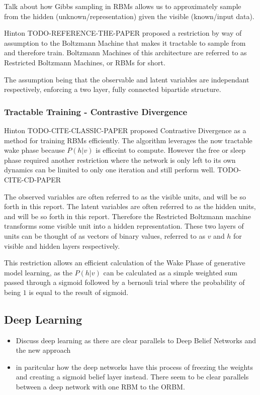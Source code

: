   \todo%
  Talk about how Gibbs sampling in RBMs allows us to approximately sample from the hidden (unknown/representation) given the visible (known/input data).
  \todo%

  Hinton TODO-REFERENCE-THE-PAPER proposed a restriction by way of assumption to the Boltzmann Machine that makes it tractable to sample from and therefore train. Boltzmann Machines of this architecture are referred to as Restricted Boltzmann Machines, or RBMs for short.

  The assumption being that the observable and latent variables are independant respectively, enforcing a two layer, fully connected bipartide structure.

    \subsubsection{Tractable Training - Contrastive Divergence}
    Hinton TODO-CITE-CLASSIC-PAPER proposed Contrastive Divergence as a method for training RBMs efficiently. The algorithm leverages the now tractable wake phase because $P(h|v)$ is efficeint to compute. However the free or sleep phase required another restriction where the network is only left to its own dynamics can be limited to only one iteration and still perform well. TODO-CITE-CD-PAPER

  The observed variables are often referred to as the visible units, and will be so forth in this report. The latent variables are often referred to as the hidden units, and will be so forth in this report. Therefore the Restricted Boltzmann machine transforms some visible unit into a hidden representation. These two layers of units can be thought of as vectors of binary values, referred to as $ v $ and $ h $ for visible and hidden layers respectively.

  This restriction allows an efficient calculation of the Wake Phase of generative model learning, as the $ P(h|v) $ can be calculated as a simple weighted sum passed through a sigmoid followed by a bernouli trial where the probability of being $1$ is equal to the result of sigmoid.



  \subsection{Deep Learning}

    \begin{itemize}
      \item Discuss deep learning as there are clear parallels to Deep Belief Networks and the new approach
      \item in paritcular how the deep networks have this process of freezing the weights and creating a sigmoid belief layer instead. There seem to be clear parallels between a deep network with one RBM to the ORBM.
    \end{itemize}

